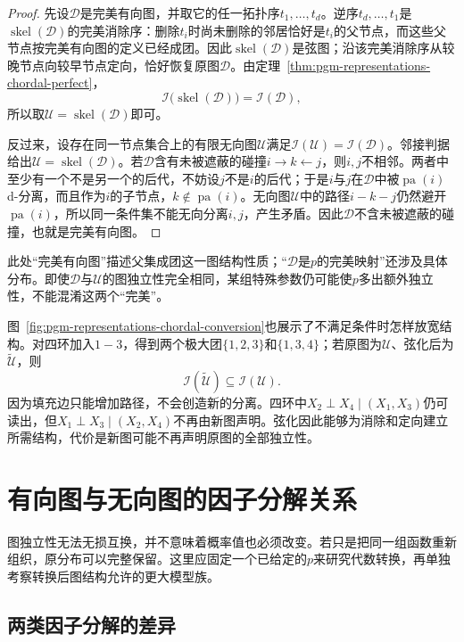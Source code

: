 \begin{proof}
先设$\mathcal{D}$是完美有向图，并取它的任一拓扑序$t_1,\ldots,t_d$。逆序$t_d,\ldots,t_1$是$\operatorname{skel}(\mathcal{D})$的完美消除序：删除$t_i$时尚未删除的邻居恰好是$t_i$的父节点，而这些父节点按完美有向图的定义已经成团。因此$\operatorname{skel}(\mathcal{D})$是弦图；沿该完美消除序从较晚节点向较早节点定向，恰好恢复原图$\mathcal{D}$。由定理~\ref{thm:pgm-representations-chordal-perfect}，
\[
  \mathcal{I}\bigl(\operatorname{skel}(\mathcal{D})\bigr)
  =\mathcal{I}(\mathcal{D}),
\]
所以取$\mathcal{U}=\operatorname{skel}(\mathcal{D})$即可。

反过来，设存在同一节点集合上的有限无向图$\mathcal{U}$满足$\mathcal{I}(\mathcal{U})=\mathcal{I}(\mathcal{D})$。邻接判据给出$\mathcal{U}=\operatorname{skel}(\mathcal{D})$。若$\mathcal{D}$含有未被遮蔽的碰撞$i\to k\leftarrow j$，则$i,j$不相邻。两者中至少有一个不是另一个的后代，不妨设$j$不是$i$的后代；于是$i$与$j$在$\mathcal{D}$中被$\operatorname{pa}(i)$ d-分离，而且作为$i$的子节点，$k\notin\operatorname{pa}(i)$。无向图$\mathcal{U}$中的路径$i-k-j$仍然避开$\operatorname{pa}(i)$，所以同一条件集不能无向分离$i,j$，产生矛盾。因此$\mathcal{D}$不含未被遮蔽的碰撞，也就是完美有向图。
\end{proof}

此处“完美有向图”描述父集成团这一图结构性质；“$\mathcal{D}$是$p$的完美映射”还涉及具体分布。即使$\mathcal{D}$与$\mathcal{U}$的图独立性完全相同，某组特殊参数仍可能使$p$多出额外独立性，不能混淆这两个“完美”。

图~\ref{fig:pgm-representations-chordal-conversion}也展示了不满足条件时怎样放宽结构。对四环加入$1-3$，得到两个极大团$\{1,2,3\}$和$\{1,3,4\}$；若原图为$\mathcal{U}$、弦化后为$\widetilde{\mathcal{U}}$，则
\[
  \mathcal{I}(\widetilde{\mathcal{U}})
  \subseteq \mathcal{I}(\mathcal{U}).
\]
因为填充边只能增加路径，不会创造新的分离。四环中$X_2\perp X_4\mid(X_1,X_3)$仍可读出，但$X_1\perp X_3\mid(X_2,X_4)$不再由新图声明。弦化因此能够为消除和定向建立所需结构，代价是新图可能不再声明原图的全部独立性。

\section{有向图与无向图的因子分解关系}
\label{sec:pgm-representations-factorizations}

图独立性无法无损互换，并不意味着概率值也必须改变。若只是把同一组函数重新组织，原分布可以完整保留。这里应固定一个已给定的$p$来研究代数转换，再单独考察转换后图结构允许的更大模型族。

\subsection{两类因子分解的差异}
\label{sec:pgm-representations-normalization}

